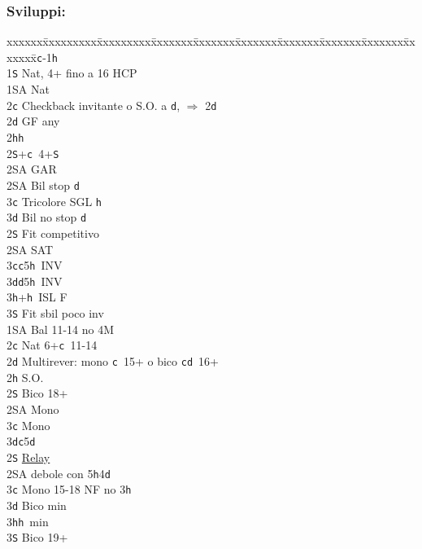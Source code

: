 \documentclass[a4paper,italian]{article}
\newcommand{\BS}{\small{\texttt{S}}}
\newcommand{\BC}{\small{\texttt{c}}}
\newcommand{\BD}{\small{\texttt{d}}}
\newcommand{\BH}{\small{\texttt{h}}}
\newenvironment{bidtable}
{\begin{tabbing}

    xxxxxx\=xxxxxxxxx\=xxxxxxxxx\=xxxxxxx\=xxxxxxx\=xxxxxxx\=xxxxxxx\=xxxxxxx\=xxxxxxx\=xxxxxxx\=\kill}
{\end{tabbing} }%
\begin{document}
\begin{multicols}{2}
    \subsubsection{Sviluppi:}

    \begin{bidtable}
        1\BC-1\BH\+\\
        1\BS \> Nat, 4+ fino a 16 HCP\+\\
        1\small{SA} \> Nat\\
        2\BC \> Checkback invitante o S.O. a \BD , $\Rightarrow$ 2\BD \\
        2\BD \> GF any\+\\
        2\BH {}\BH \\
        2\BS {}+\BC\ 4+\BS \+\\
        2\small{SA} \> GAR\-\\
        2\small{SA} \> Bil stop \BD \\
        3\BC \> Tricolore SGL \BH \\
        3\BD \> Bil no stop \BD \-\\
        [2pt]2\BS \> Fit competitivo\\
        2\small{SA} \small{SA}T\\
        3\BC {}\BC 5\BH\ INV\\
        3\BD {}\BD 5\BH\ INV\\
        3\BH {}+\BH\ ISL F\\
        3\BS \> Fit sbil poco inv\-\\
        1\small{SA} \> Bal 11-14 no 4M\\
        2\BC \> Nat 6+\BC\ 11-14\\
        2\BD \> Multirever: mono \BC\ 15+ o bico \BC \BD\ 16+\+\\
        2\BH \> S.O.\+\\
        2\BS \> Bico 18+\\
        2\small{SA}\> Mono\\
        3\BC \> Mono\\
        3\BD {}\BC 5\BD \-\\
        2\BS \> \hyperref[multirever]{Relay}\\
        2\small{SA} \> debole con 5\BH 4\BD \+\\
        3\BC \> Mono 15-18 NF no 3\BH\\
        3\BD \> Bico min\\
        3\BH {}\BH\ min\\
        3\BS \> Bico 19+\\

\end{bidtable}
\end{multicols}
\end{document}
